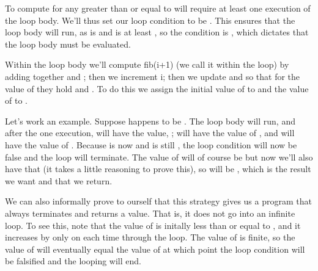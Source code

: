\documentclass[letterpaper,10pt,english]{sphinxmanual}
\begin{document}
To compute  for any  greater than or equal to  will
require at least one execution of the loop body. We’ll thus set our
loop condition to be . This ensures that the loop body will
run, as  is  and  is at least , so the condition 
is , which dictates that the loop body must be evaluated.

Within the loop body we’ll compute fib(i+1) (we call it  within
the loop) by adding together  and ; then we increment i;
then we update  and  so that for the  value of 
they hold  and . To do this we assign the initial
value of  to  and the value of  to .

Let’s work an example. Suppose  happens to be . The loop body
will run, and after the one execution,  will have the value, ;
 will have the value of , and  will have the value
of . Because  is now  and  is still , the loop
condition will now be false and the loop will terminate. The value of
 will of course be  but now we’ll also have that  (it takes a little reasoning to prove this), so  will be
, which is the result we want and that we return.

We can also informally prove to ourself that this strategy gives us
a program that always terminates and returns a value. That is, it does
not go into an infinite loop. To see this, note that the value of 
is initally less than or equal to , and it increases by only  on
each time through the loop. The value of  is finite, so the value
of  will eventually equal the value of  at which point the loop
condition will be falsified and the looping will end.
\end{document}
